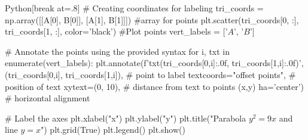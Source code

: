 \documentclass{beamer}
\theoremstyle{remark}
\numberwithin{equation}{section}
\begin{document}
\begin{frame}
\begin{mintedbox}{Python}[break at=.8\textheight]
# Creating coordinates for labeling
tri_coords = np.array([[A[0], B[0]], [A[1], B[1]]])  #array for points
plt.scatter(tri_coords[0, :], tri_coords[1, :], color='black') #Plot points
vert_labels = ['$A$', '$B$']

# Annotate the points using the provided syntax
for i, txt in enumerate(vert_labels):
    plt.annotate(f'{txt}\n({tri_coords[0,i]:.0f}, {tri_coords[1,i]:.0f})',
                 (tri_coords[0,i], tri_coords[1,i]),  # point to label
                 textcoords="offset points",  # position of text
                 xytext=(0, 10),  # distance from text to points (x,y)
                 ha='center')  # horizontal alignment

# Label the axes
plt.xlabel("x")
plt.ylabel("y")
plt.title("Parabola $y^2 = 9x$ and line $y=x$")
plt.grid(True)
plt.legend()
plt.show()
  \end{mintedbox}
\end{frame}


\end{document}

